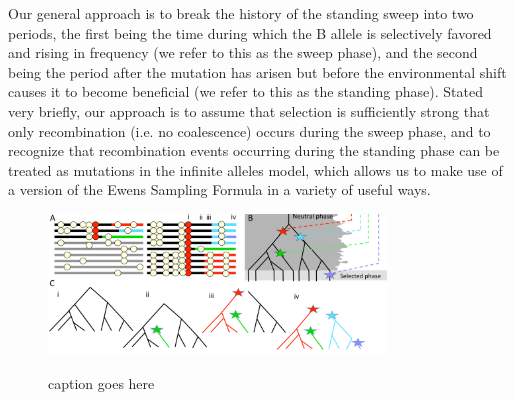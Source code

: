 \documentclass[a4paper,10pt]{article}
\newcommand{\fancyN}{$\mathcal N$ }
\newcommand{\fancyB}{$\mathcal B$ }
\newcommand{\jb}[1]{{\it\color{blue} (#1)} }
\begin{document}
Our general approach is to break the history of the standing sweep into two periods, the first being the time during which the B allele is selectively favored and rising in frequency (we refer to this as the sweep phase), and the second being the period after the mutation has arisen but before the environmental shift causes it to become beneficial (we refer to this as the standing phase). Stated very briefly, our approach is to assume that selection is sufficiently strong that only recombination (i.e. no coalescence) occurs during the sweep phase, and to recognize that recombination events occurring during the standing phase can be treated as mutations in the infinite alleles model, which allows us to make use of a version of the Ewens Sampling Formula in a variety of useful ways. %


\begin{figure}
	\includegraphics[width = 0.8\textwidth]{../Paper_Figures/Cartoon_of_soft_sweeps.pdf} \label{cartoon_fig_1}
	\caption{caption goes here}
\end{figure}
\end{document}
